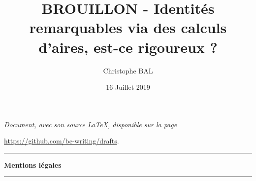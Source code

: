 \documentclass[12pt]{amsart}
\begin{document}
\title{BROUILLON - Identités remarquables via des calculs d'aires, est-ce rigoureux ?}
\author{Christophe BAL}
\date{16 Juillet 2019}

\maketitle

\begin{center}
	\itshape
	Document, avec son source \LaTeX, disponible sur la page
	
	\url{https://github.com/bc-writing/drafts}.
\end{center}


\bigskip


\begin{center}
	\hrule\vspace{.3em}
	{
		\fontsize{1.35em}{1em}\selectfont
		\textbf{Mentions \og légales \fg}
	}
			
	\vspace{0.45em}
	\doclicenseThis
	\hrule
\end{center}



\vspace{1.75em}


\begin{figure} 
	\vspace{-.5em}
	\begin{center}
	\end{center}
	\vspace{-2.25em}
\end{figure} 
\end{document}
